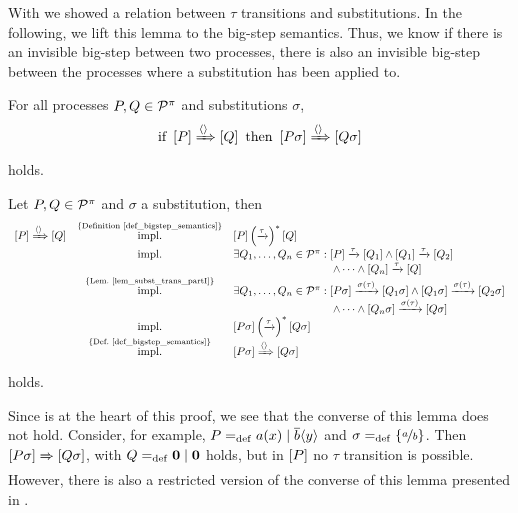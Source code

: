 With  we showed a relation between $\tau$ transitions and substitutions. In the following, we lift this lemma to the big-step semantics. Thus, we know if there is an invisible big-step between two processes, there is also an invisible big-step between the processes where a substitution has been applied to.

\begin{lemma}
\label{lem_subst_bigstep_partI}
For all processes $P,Q\in\mathcal P^{\pi}$ and substitutions $\sigma$,
\[\text{if } \left[P\right]\xRightarrow{\langle\rangle}\left[Q\right] \text{ then } \left[P\sigma\right]\xRightarrow{\langle\rangle}\left[Q\sigma\right]\]
holds.
\end{lemma}
\begin{prf}
Let $P,Q\in\mathcal P^{\pi}$ and $\sigma$ a substitution, then
\begin{align*}
	\begin{array}{lcl}
		\ec{P}\bigstep{\eseq}\ec{Q} & \stackrel{\{\text{\refDef{def_bigstep_semantics}\}}}{\text{impl.}} & \ec{P}\left(\tautrans\right)^*\ec{Q} \\
			& \text{impl.} & \exists{}Q_1,\ldots,Q_n\in\procs:\ec{P}\tautrans\ec{Q_1}\wedge\ec{Q_1}\tautrans\ec{Q_2} \\
					&&\quad\quad\quad\quad\quad\quad\quad\quad\quad \wedge \cdots\wedge\ec{Q_n}\tautrans\ec{Q} \\		
			& \stackrel{\{\text{Lem.~\ref{lem_subst_trans_partI}\}}}{\text{impl.}} & \exists{}Q_1,\ldots,Q_n\in\procs:\ec{P\sigma}\transs{\sigma(\tau)}\ec{Q_1\sigma}\wedge\ec{Q_1\sigma}\transs{\sigma(\tau)}\ec{Q_2\sigma} \\
					&&\quad\quad\quad\quad\quad\quad\quad\quad\quad \wedge \cdots\wedge\ec{Q_n\sigma}\transs{\sigma(\tau)}\ec{Q\sigma}\\
			& \text{impl.} & \ec{P\sigma}\left(\tautrans\right)^*\ec{Q\sigma} \\
			& \stackrel{\{\text{Def.~\ref{def_bigstep_semantics}\}}}{\text{impl.}} & \ec{P\sigma}\bigstep{\eseq}\ec{Q\sigma}
	\end{array}
\end{align*}
holds.
\end{prf}

Since  is at the heart of this proof, we see that the converse of this lemma does not hold. Consider, for example, $P=_{\mathrm{def}}a(x) \mid \overline{b}\langle y\rangle$ and $\sigma=_{\mathrm{def}}\left\{\nicefrac{a}{b}\right\}$. Then $\left[P\sigma\right]\xRightarrow{}\left[Q\sigma\right]$, with $Q=_{\mathrm{def}}\mathbf{0} \mid \mathbf{0}$ holds, but in $\left[P\right]$ no $\tau$ transition is possible. However, there is also a restricted version of the converse of this lemma presented in .

